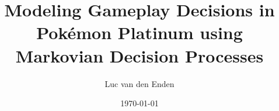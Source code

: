 \title{Modeling Gameplay Decisions in Pokémon Platinum using Markovian Decision Processes}

\author{Luc van den Enden}
\date{\today}

\maketitle

